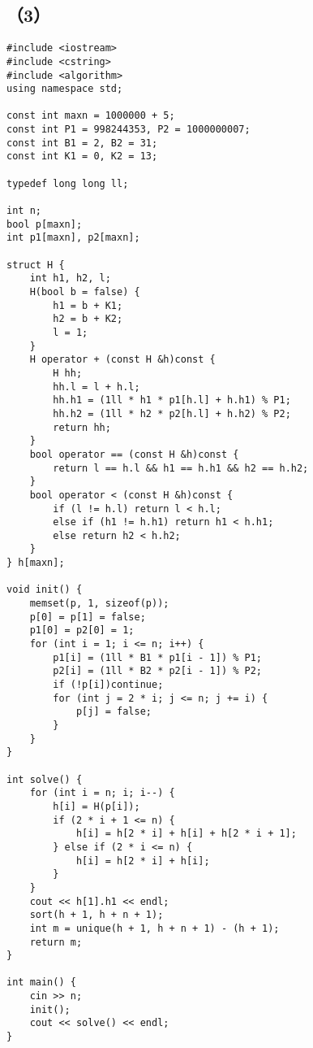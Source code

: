 \documentclass{exam-zh}
\begin{document}
\begin{solution}
  
\end{solution}


\subsection*{（3）} %

\begin{lstlisting}
#include <iostream>
#include <cstring>
#include <algorithm>
using namespace std;

const int maxn = 1000000 + 5;
const int P1 = 998244353, P2 = 1000000007;
const int B1 = 2, B2 = 31;
const int K1 = 0, K2 = 13;

typedef long long ll;

int n;
bool p[maxn];
int p1[maxn], p2[maxn];

struct H {
    int h1, h2, l;
    H(bool b = false) {
        h1 = b + K1;
        h2 = b + K2;
        l = 1;
    }
    H operator + (const H &h)const {
        H hh;
        hh.l = l + h.l;
        hh.h1 = (1ll * h1 * p1[h.l] + h.h1) % P1;
        hh.h2 = (1ll * h2 * p2[h.l] + h.h2) % P2;
        return hh;
    }
    bool operator == (const H &h)const {
        return l == h.l && h1 == h.h1 && h2 == h.h2;
    }
    bool operator < (const H &h)const {
        if (l != h.l) return l < h.l;
        else if (h1 != h.h1) return h1 < h.h1;
        else return h2 < h.h2;
    }
} h[maxn];

void init() {
    memset(p, 1, sizeof(p));
    p[0] = p[1] = false;
    p1[0] = p2[0] = 1;
    for (int i = 1; i <= n; i++) {
        p1[i] = (1ll * B1 * p1[i - 1]) % P1;
        p2[i] = (1ll * B2 * p2[i - 1]) % P2;
        if (!p[i])continue;
        for (int j = 2 * i; j <= n; j += i) {
            p[j] = false;
        }
    }
}

int solve() {
    for (int i = n; i; i--) {
        h[i] = H(p[i]);
        if (2 * i + 1 <= n) {
            h[i] = h[2 * i] + h[i] + h[2 * i + 1];
        } else if (2 * i <= n) {
            h[i] = h[2 * i] + h[i];
        }
    }
    cout << h[1].h1 << endl;
    sort(h + 1, h + n + 1);
    int m = unique(h + 1, h + n + 1) - (h + 1);
    return m;
}

int main() {
    cin >> n;
    init();
    cout << solve() << endl;
}
\end{lstlisting}
    
    \begin{solution}

    \end{solution}
    
\end{document}
